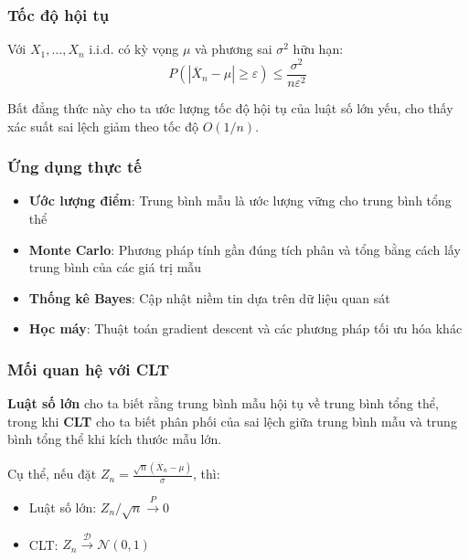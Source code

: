 \subsubsection*{Tốc độ hội tụ}
\begin{dl}
Với $X_1,\ldots,X_n$ i.i.d. có kỳ vọng $\mu$ và phương sai $\sigma^2$ hữu hạn:
\[
P(|\overline{X}_n-\mu|\geq\varepsilon)\leq\frac{\sigma^2}{n\varepsilon^2}
\]
\end{dl}

\begin{tinhchat}
Bất đẳng thức này cho ta ước lượng tốc độ hội tụ của luật số lớn yếu, cho thấy xác suất sai lệch giảm theo tốc độ $O(1/n)$.
\end{tinhchat}

\subsubsection*{Ứng dụng thực tế}
\begin{itemize}
    \item \textbf{Ước lượng điểm}: Trung bình mẫu là ước lượng vững cho trung bình tổng thể
    \item \textbf{Monte Carlo}: Phương pháp tính gần đúng tích phân và tổng bằng cách lấy trung bình của các giá trị mẫu
    \item \textbf{Thống kê Bayes}: Cập nhật niềm tin dựa trên dữ liệu quan sát
    \item \textbf{Học máy}: Thuật toán gradient descent và các phương pháp tối ưu hóa khác
\end{itemize}

\subsubsection*{Mối quan hệ với CLT}
\begin{tinhchat}
\textbf{Luật số lớn} cho ta biết rằng trung bình mẫu hội tụ về trung bình tổng thể, trong khi \textbf{CLT} cho ta biết phân phối của sai lệch giữa trung bình mẫu và trung bình tổng thể khi kích thước mẫu lớn.

Cụ thể, nếu đặt $Z_n=\frac{\sqrt{n}(\overline{X}_n-\mu)}{\sigma}$, thì:
\begin{itemize}
    \item Luật số lớn: $Z_n/\sqrt{n}\xrightarrow{P}0$
    \item CLT: $Z_n\xrightarrow{\mathcal{D}}\mathcal{N}(0,1)$
\end{itemize}
\end{tinhchat}

